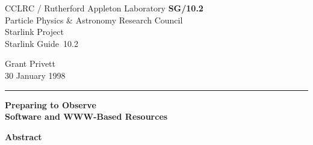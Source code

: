 \documentclass[twoside,11pt]{article}
\newcommand{\stardoccategory}  {Starlink Guide}
\newcommand{\stardocinitials}  {SG}
\newcommand{\stardocnumber}    {10.2}
\newcommand{\stardocauthors}   {Grant Privett}
\newcommand{\stardocdate}      {30 January 1998}
\newcommand{\stardoctitle}     {Preparing to Observe}
\newcommand{\stardocversion}   {Software and WWW-Based Resources}
\newcommand{\stardocname}{\stardocinitials /\stardocnumber}
\newenvironment{latexonly}{}{}
\begin{document}
\thispagestyle{empty}

\begin{latexonly}
   CCLRC / {\sc Rutherford Appleton Laboratory} \hfill {\bf \stardocname}\\
   {\large Particle Physics \& Astronomy Research Council}\\
   {\large Starlink Project\\}
   {\large \stardoccategory\ \stardocnumber}
   \begin{flushright}
   \stardocauthors\\
   \stardocdate
   \end{flushright}
   \vspace{-4mm}
   \rule{\textwidth}{0.5mm}
   \vspace{5mm}
   \begin{center}
   {\Huge\bf  \stardoctitle \\ [2.5ex]}
   {\LARGE\bf \stardocversion \\ [4ex]}
   \end{center}

   \vspace{10mm}
   \begin{center}
   \begin{figure}[h]
   \leavevmode
   \centering {}
   \end{figure}
   \end{center}

   \begin{center}
      {\Large\bf Abstract}
   \end{center}

\end{latexonly}
\end{document}
